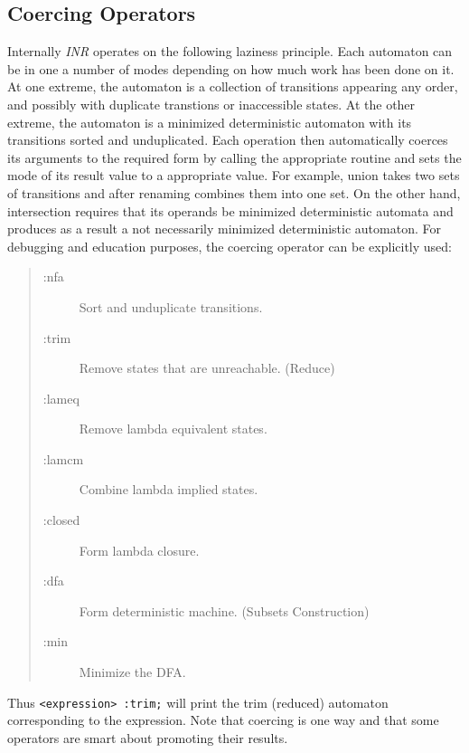 \subsection{Coercing Operators}
Internally {\em INR} operates on the following laziness principle.
Each automaton can be in one a number of modes depending on how much work
has been done on it.
At one extreme, the automaton is a collection of transitions appearing any
order, and possibly with duplicate transtions or inaccessible states.
At the other extreme, the automaton is a minimized deterministic automaton
with its transitions sorted and unduplicated.
Each operation then automatically coerces its arguments to the required
form by calling the appropriate routine and sets the mode of its result
value to a appropriate value.
For example, union takes two sets of transitions and after renaming
combines them into one set.
On the other hand, intersection requires that its operands be minimized
deterministic automata and produces as a result a not necessarily minimized
deterministic automaton.
For debugging and education purposes, the coercing operator can be
explicitly used:
\begin{quote}
\begin{description}
\item[:nfa] Sort and unduplicate transitions.
\item[:trim] Remove states that are unreachable. (Reduce)
\item[:lameq] Remove lambda equivalent states.
\item[:lamcm] Combine lambda implied states.
\item[:closed] Form lambda closure.
\item[:dfa] Form deterministic machine. (Subsets Construction)
\item[:min] Minimize the DFA.
\end{description}
\end{quote}
Thus \verb#<expression> :trim;#
will print the trim (reduced) automaton corresponding to the expression.
Note that coercing is one way and that some operators are smart about
promoting their results.
